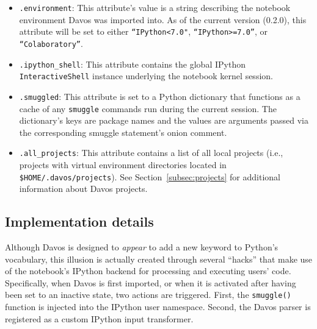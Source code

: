 \documentclass[preprint,12pt,a4paper]{elsarticle}
\begin{document}
\begin{itemize}

\item \texttt{.environment}: This attribute's value is a string describing the notebook
environment Davos was imported into. As of the current version (0.2.0), this
attribute will be set to either \texttt{“IPython<7.0"}, \texttt{“IPython>=7.0”}, or \texttt{“Colaboratory”}.

  \item \texttt{.ipython\_shell}: This attribute contains the global IPython \texttt{InteractiveShell} instance underlying the notebook kernel session.

  \item \texttt{.smuggled}: This attribute is set to a Python dictionary that functions as a cache of any \texttt{smuggle} commands run during the current
session.  The dictionary's keys are package names and the values are arguments passed via the corresponding smuggle statement's onion comment.

  \item \texttt{.all\_projects}: This attribute contains a list of all local projects (i.e., projects with virtual environment directories located in \texttt{\$HOME/.davos/projects}).  See Section~\ref{subsec:projects} for additional information about Davos projects.

\end{itemize}


\subsection{Implementation details}\label{subsec:implementation}

Although Davos is designed to \textit{appear} to add a new
keyword to Python's vocabulary, this illusion is actually created through
several ``hacks'' that make use of the notebook's IPython backend
for processing and executing users' code.  Specifically, when
Davos is first imported, or when it is activated after having been
set to an inactive state, two actions are triggered.  First, the
\texttt{smuggle()} function is injected into the IPython user
namespace.  Second, the Davos parser is registered as a
custom IPython input transformer.
\end{document}
